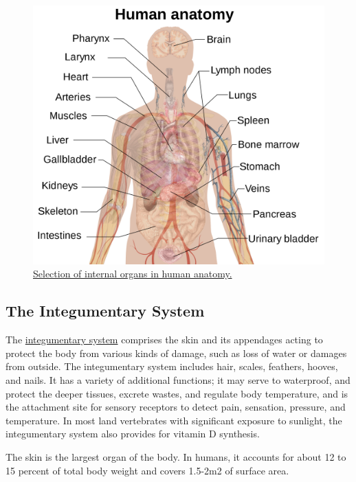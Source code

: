 \begin{figure}

{\centering \includegraphics[width=0.7\linewidth]{./figures/animals/Internal_organs} 

}

\caption{\href{https://commons.wikimedia.org/wiki/File:Internal_organs.svg}{Selection of internal organs in human anatomy.}}\label{fig:humanorgans}
\end{figure}

\hypertarget{the-integumentary-system}{%
\subsection{The Integumentary System}\label{the-integumentary-system}}

The \href{https://en.wikipedia.org/wiki/Integumentary_system}{integumentary system} comprises the skin and its appendages acting to protect the body from various kinds of damage, such as loss of water or damages from outside. The integumentary system includes hair, scales, feathers, hooves, and nails. It has a variety of additional functions; it may serve to waterproof, and protect the deeper tissues, excrete wastes, and regulate body temperature, and is the attachment site for sensory receptors to detect pain, sensation, pressure, and temperature. In most land vertebrates with significant exposure to sunlight, the integumentary system also provides for vitamin D synthesis.

The skin is the largest organ of the body. In humans, it accounts for about 12 to 15 percent of total body weight and covers 1.5-2m2 of surface area.

